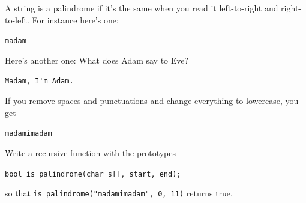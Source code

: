 A string is a palindrome if it's the same when you read it left-to-right and right-to-left. For instance here's one:



\verb!madam!



Here's another one: What does Adam say to Eve?



\verb!Madam, I'm Adam.!



If you remove spaces and punctuations and change everything to lowercase, you get



\verb!madamimadam!



Write a recursive function with the prototypes



\verb!bool is_palindrome(char s[], start, end);!



so that \verb!is_palindrome("madamimadam", 0, 11)! returns true.

